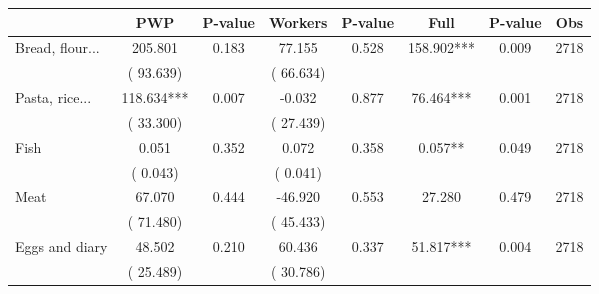 
\begin{tabular}{l*{7}{c}}\hline&\multicolumn{1}{c}{PWP}&\multicolumn{1}{c}{P-value}&\multicolumn{1}{c}{Workers}&\multicolumn{1}{c}{P-value}&\multicolumn{1}{c}{Full}&\multicolumn{1}{c}{P-value}&\multicolumn{1}{c}{Obs} \\ \hline

 Bread, flour...       &            205.801       &        0.183  &             77.155       &        0.528  &            158.902***       &              0.009 &  2718 \\ 
                       &       (      93.639)             &                               &       (      66.634)                     &                               &                                               &                                &                      \\ 

 Pasta, rice...       &            118.634***       &        0.007  &             -0.032       &        0.877  &             76.464***       &              0.001 &  2718 \\ 
                       &       (      33.300)             &                               &       (      27.439)                     &                               &                                               &                                &                      \\ 

 Fish       &              0.051       &        0.352  &              0.072       &        0.358  &              0.057**       &              0.049 &  2718 \\ 
                       &       (       0.043)             &                               &       (       0.041)                     &                               &                                               &                                &                      \\ 

 Meat       &             67.070       &        0.444  &            -46.920       &        0.553  &             27.280       &              0.479 &  2718 \\ 
                       &       (      71.480)             &                               &       (      45.433)                     &                               &                                               &                                &                      \\ 

 Eggs and diary       &             48.502       &        0.210  &             60.436       &        0.337  &             51.817***       &              0.004 &  2718 \\ 
                       &       (      25.489)             &                               &       (      30.786)                     &                               &                                               &                                &                      \\ 


\end{tabular}
